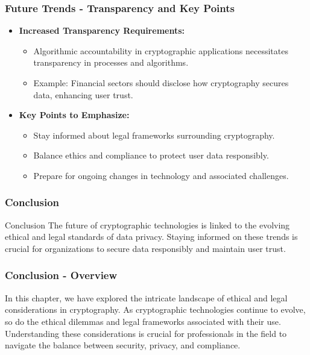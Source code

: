 \documentclass{beamer}
\begin{document}
\begin{frame}[fragile]
  \frametitle{Future Trends - Transparency and Key Points}
  \begin{itemize}
    \item \textbf{Increased Transparency Requirements:}
    \begin{itemize}
      \item Algorithmic accountability in cryptographic applications necessitates transparency in processes and algorithms.
      \item Example: Financial sectors should disclose how cryptography secures data, enhancing user trust.
    \end{itemize}
    
    \item \textbf{Key Points to Emphasize:}
    \begin{itemize}
      \item Stay informed about legal frameworks surrounding cryptography.
      \item Balance ethics and compliance to protect user data responsibly.
      \item Prepare for ongoing changes in technology and associated challenges.
    \end{itemize}
  \end{itemize}
\end{frame}

\begin{frame}[fragile]
  \frametitle{Conclusion}
  \begin{block}{Conclusion}
    The future of cryptographic technologies is linked to the evolving ethical and legal standards of data privacy. Staying informed on these trends is crucial for organizations to secure data responsibly and maintain user trust.
  \end{block}
\end{frame}

\begin{frame}[fragile]
    \frametitle{Conclusion - Overview}
    In this chapter, we have explored the intricate landscape of ethical and legal considerations in cryptography. As cryptographic technologies continue to evolve, so do the ethical dilemmas and legal frameworks associated with their use. Understanding these considerations is crucial for professionals in the field to navigate the balance between security, privacy, and compliance.
\end{frame}
\end{document}
